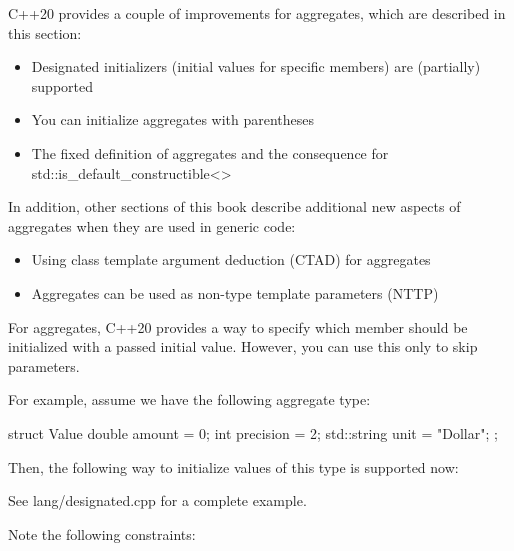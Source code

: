 
C++20 provides a couple of improvements for aggregates, which are described in this section:

\begin{itemize}
\item 
Designated initializers (initial values for specific members) are (partially) supported

\item 
You can initialize aggregates with parentheses

\item 
The fixed definition of aggregates and the consequence for std::is\_default\_constructible<>
\end{itemize}

In addition, other sections of this book describe additional new aspects of aggregates when they are used in generic code:

\begin{itemize}
\item 
Using class template argument deduction (CTAD) for aggregates

\item 
Aggregates can be used as non-type template parameters (NTTP)
\end{itemize}


For aggregates, C++20 provides a way to specify which member should be initialized with a passed initial value. However, you can use this only to skip parameters.

For example, assume we have the following aggregate type:

\begin{cpp}
struct Value {
	double amount = 0;
	int precision = 2;
	std::string unit = "Dollar";
};
\end{cpp}

Then, the following way to initialize values of this type is supported now:


See lang/designated.cpp for a complete example.

Note the following constraints:

